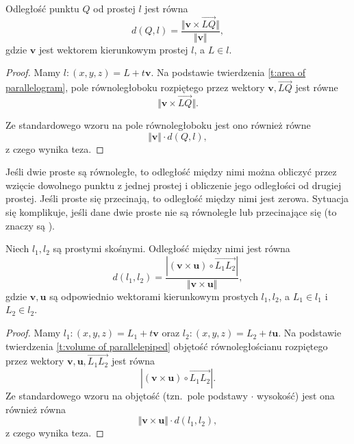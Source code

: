 \begin{theorem}
    Odległość punktu $Q$ od prostej $l$ jest równa
    \[ d(Q, l) = \frac{\Vert \symbf{v} \times \overrightarrow{LQ}\Vert}{\Vert\symbf{v}\Vert}, \]
    gdzie $\symbf{v}$ jest wektorem kierunkowym prostej $l$, a $L \in l$.
\end{theorem}
\begin{proof}
    Mamy $l : (x, y, z) = L + t\symbf{v}$. Na podstawie twierdzenia \ref{t:area of parallelogram}, pole równoległoboku rozpiętego przez wektory $\symbf{v}, \overrightarrow{LQ}$ jest równe
    \[ \Vert \symbf{v} \times \overrightarrow{LQ} \Vert. \]
    \begin{center}
    \end{center}
    Ze standardowego wzoru na pole równoległoboku jest ono również równe
    \[ \Vert \symbf{v} \Vert \cdot d(Q, l), \]
    z czego wynika teza.
\end{proof}

Jeśli dwie proste są równoległe, to odległość między nimi można obliczyć przez wzięcie dowolnego punktu z jednej prostej i obliczenie jego odległości od drugiej prostej. Jeśli proste się przecinają, to odległość między nimi jest zerowa. Sytuacja się komplikuje, jeśli dane dwie proste nie są równoległe lub przecinające się (to znaczy są ).

\begin{theorem}
    \label{t:distance between lines}
    Niech $l_1, l_2$ są prostymi skośnymi. Odległość między nimi jest równa
    \[ d(l_1, l_2) = \frac{|(\symbf{v} \times \symbf{u}) \circ \overrightarrow{L_1L_2}|}{\Vert\symbf{v}\times\symbf{u}\Vert}, \]
    gdzie $\symbf{v}, \symbf{u}$ są odpowiednio wektorami kierunkowym prostych $l_1, l_2$, a $L_1 \in l_1$ i $L_2 \in l_2$.
\end{theorem}
\begin{proof}
    Mamy $l_1 : (x, y, z) = L_1 + t\symbf{v}$ oraz $l_2 : (x, y, z) = L_2 + t\symbf{u}$. Na podstawie twierdzenia \ref{t:volume of parallelepiped} objętość równoległościanu rozpiętego przez wektory $\symbf{v}, \symbf{u}, \overrightarrow{L_1L_2}$ jest równa
    \[ |(\symbf{v} \times \symbf{u}) \circ \overrightarrow{L_1L_2}|. \]
    Ze standardowego wzoru na objętość (tzn.\ pole podstawy $\cdot$ wysokość) jest ona również równa
    \[ \Vert\symbf{v}\times\symbf{u}\Vert \cdot d(l_1, l_2), \]
    z czego wynika teza.
\end{proof}


